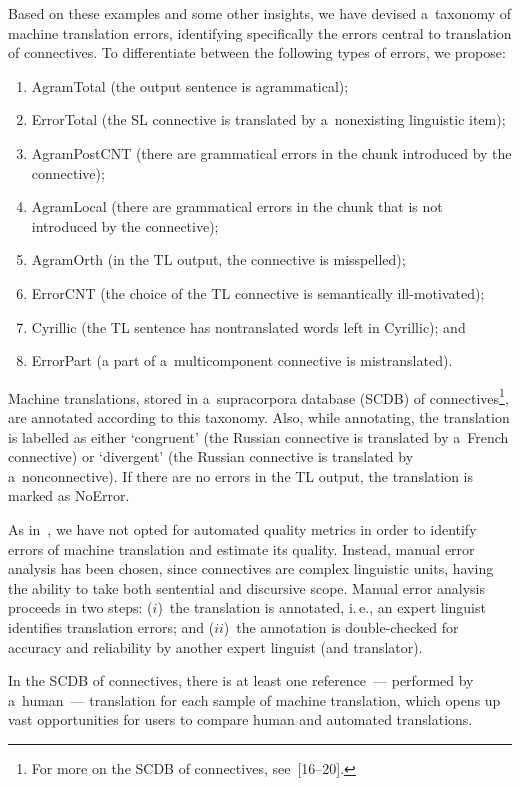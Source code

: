 \begin{multicols}{2}
  Based on these examples and some other insights, we have devised a~taxonomy 
of machine translation errors, identifying specifically the errors central to 
translation of connectives.  To differentiate between the following types 
of errors, we propose:
  \begin{enumerate}[(1)]
  \item  AgramTotal (the output sentence is agrammatical);
  \item ErrorTotal (the SL connective is translated by a~nonexisting linguistic 
item);
  \item AgramPostCNT (there are grammatical errors in the chunk introduced by 
the connective);
  \item AgramLocal (there are grammatical errors in the chunk that is not 
introduced by the connective);
  \item AgramOrth (in the TL output, the connective is misspelled);
  \item ErrorCNT (the choice of the TL connective is semantically ill-motivated);
  \item Cyrillic (the TL sentence has nontranslated words left in Cyrillic); and
  \item ErrorPart (a part of a~multicomponent connective is mistranslated).
  \end{enumerate}
  
  Machine translations, stored in a~supracorpora database (SCDB) of 
connectives\footnote{For more on the SCDB of connectives, see~[16--20].}, are annotated 
according to this taxonomy. Also, while annotating, the translation is labelled as 
either `congruent' (the Russian connective is translated by a~French connective) or 
`divergent' (the Russian connective is translated by a~nonconnective). If there are 
no errors in the TL output, the translation is marked as NoError.
  
  As in~\cite{13-n}, we have not opted for automated quality metrics in order to 
identify errors of machine translation and estimate its quality. Instead, manual error 
analysis has been chosen, since connectives are complex linguistic units, having 
the ability to take both sentential and discursive scope. Manual error analysis 
proceeds in two steps: ($i$)~the translation is annotated, i.\,e., an expert linguist 
identifies translation errors; and ($ii$)~the annotation is double-checked for accuracy and 
reliability by another expert linguist (and translator).


  
  In the SCDB of connectives, there is at least one reference~--- performed by 
a~human~--- translation for each sample of machine translation, which opens up 
vast opportunities for users to compare human and automated translations.


\end{multicols}

